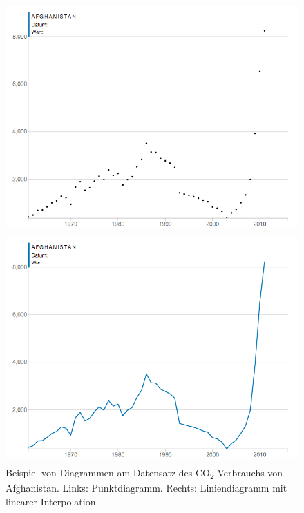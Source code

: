 \begin{figure}[!htbp]
	\centering
	\begin{minipage}{0.45\textwidth}
		\centering
		\includegraphics[width=\linewidth]{images/scatterplot_no_interpolation}
	\end{minipage}\hfill
	\begin{minipage}{0.45\textwidth}
		\centering
		\includegraphics[width=\linewidth]{images/scatterplot_interpolated}
	\end{minipage}
	\caption[Vergleich zwischen Punktdiagramm und Liniendiagramm]{Beispiel von Diagrammen am Datensatz des CO\textsubscript{2}-Verbrauchs von Afghanistan. Links: Punktdiagramm. Rechts: Liniendiagramm mit linearer Interpolation.}
	\label{fig:scatterplot}
\end{figure}

